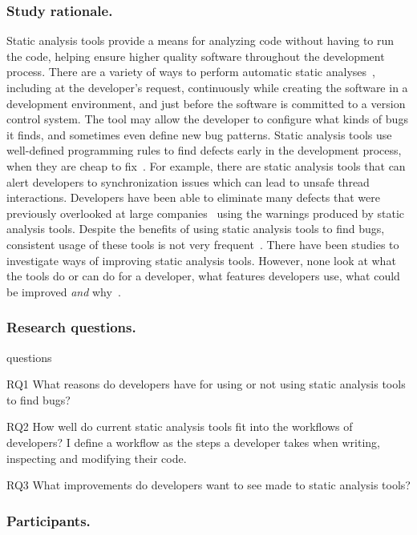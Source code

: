 \documentclass{llncs}
\begin{document}
\subsubsection{Study rationale.} Static analysis tools provide a means for analyzing code without having to run
the code, helping ensure higher quality software throughout the development process. There are a variety of ways to perform automatic static
analyses~\cite{Gegick:2007:AutomatedAnalysis}, including at the developer's request, continuously while creating the software in a development
environment, and just before the software is committed to a version control system. The tool may allow the developer to configure what kinds of bugs it
finds, and sometimes even define new bug patterns. Static analysis tools use well-defined programming rules to find defects early in the development process, when they
are cheap to fix~\cite{Ayewah:2008:FindBugs}. For example, there are static analysis tools that can alert developers to synchronization issues which can
lead to unsafe thread interactions. Developers have been able to eliminate many defects that were previously overlooked at large companies~\cite{Ayewah:2010:GFF} using the warnings produced
by static analysis tools. 
Despite the benefits of using static analysis tools to find bugs, consistent usage of these tools is not very frequent~\cite{Ayewah:2008:FindBugs}. 
There have been studies to investigate ways of improving static analysis tools. However, none look at what the tools do or can do for a developer, what features
developers use, what could be improved \emph{and} why~\cite{Bessey:2010:Coverity,Khoo:2008:PathProjection}. 

\subsubsection{Research questions.}
\begin{labeling}{questions}
	\item [RQ1] What reasons do developers have for using or not using static analysis tools to find bugs?
	\item [RQ2] How well do current static analysis tools fit into the workflows of developers? I define a workflow as the steps a developer takes when writing, inspecting and modifying their code.
	\item [RQ3] What improvements do developers want to see made to static analysis tools?
\end{labeling}

\subsubsection{Participants.}
\end{document}
